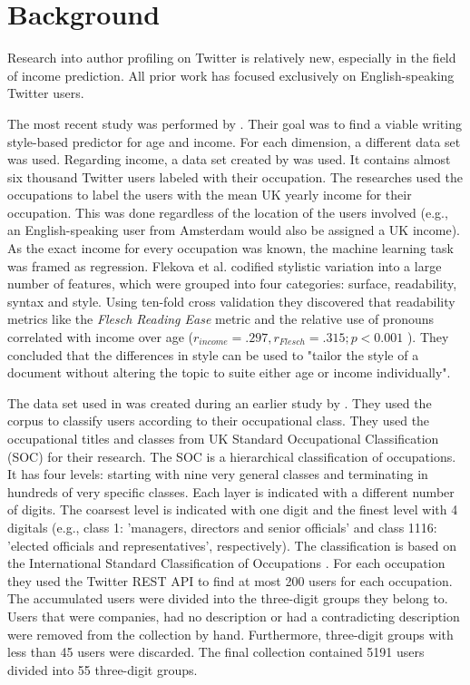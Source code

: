 \documentclass[
10pt, %
a4paper, %
oneside, %
headinclude,footinclude, %
] {book}%
\begin{document}
\chapter{Background}
Research into author profiling on Twitter is relatively new, especially in the field of income prediction. All prior work has focused exclusively on English-speaking Twitter users.

The most recent study was performed by \citet{flekova}. Their goal was to find a viable writing style-based predictor for age and income. For each dimension, a different data set was used. 
Regarding income, a data set created by \citet{pietro} was used. It contains almost six thousand Twitter users labeled with their occupation. The researches used the occupations to label the users with the mean UK yearly income for their occupation. This was done regardless of the location of the users involved (e.g., an English-speaking user from Amsterdam would also be assigned a UK income). 
As the exact income for every occupation was known, the machine learning task was framed as regression. Flekova et al. codified stylistic variation into a large number of features, which were grouped into four categories: surface, readability, syntax and style. 
Using ten-fold cross validation they discovered that readability metrics like the \textit{Flesch Reading Ease} metric and the relative use of pronouns correlated with income over age (\(r_{income} = .297,  r_{Flesch} = .315;  p < 0.001 \) ). They concluded that the differences in style can be used to "tailor the style of a document without altering the topic to suite either age or income individually".

The data set used in \citet{flekova} was created during an earlier study by \citet{pietro}. They used the corpus to classify users according to their occupational class. 
They used the occupational titles and classes from UK Standard Occupational Classification (SOC) \citep{uksoc} for their research. The SOC is a hierarchical classification of occupations. It has four levels: starting with nine very general classes and terminating in hundreds of very specific classes. Each layer is indicated with a different number of digits. The coarsest level is indicated with one digit and the finest level with 4 digitals (e.g., class 1: 'managers, directors and senior officials' and class 1116: 'elected officials and representatives', respectively). The classification is based on the International Standard Classification of Occupations \citep{isco}.
For each occupation they used the Twitter REST API to find at most 200 users for each occupation. The accumulated users were divided into the three-digit groups they belong to. Users that were companies, had no description or had a contradicting description were removed from the collection by hand. Furthermore, three-digit groups with less than 45 users were discarded. The final collection contained 5191 users divided into 55 three-digit groups.
\end{document}
